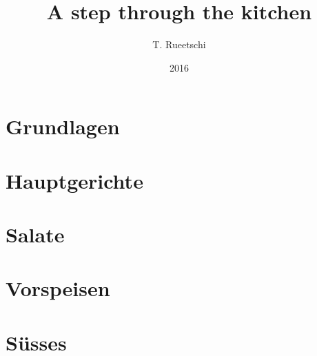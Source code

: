 \documentclass[
  a5paper,
  ngerman,
  10pt,
]{spcookbook}
\title{A step through the kitchen}
\author{T. Rueetschi}
\date{2016}
\begin{document}
\Titlepage%
\tableofcontents

\section{Grundlagen}


\section{Hauptgerichte}










\section{Salate}


\section{Vorspeisen}



\section{S\"usses}


\newpage


\end{document}
